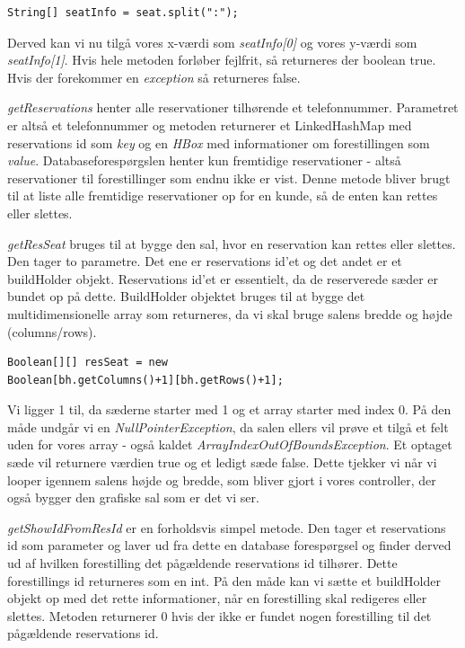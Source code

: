 \documentclass[final]{report}
\begin{document}
\begin{verbatim}
String[] seatInfo = seat.split(":");
\end{verbatim}

Derved kan vi nu tilgå vores x-værdi som \emph{seatInfo[0]} og vores y-værdi som \emph{seatInfo[1]}. Hvis hele metoden forløber fejlfrit, så returneres der boolean true. Hvis der forekommer en \emph{exception} så returneres false. 

\emph{getReservations} henter alle reservationer tilhørende et telefonnummer. Parametret er altså et telefonnummer og metoden returnerer et LinkedHashMap med reservations id som \emph{key} og en \emph{HBox} med informationer om forestillingen som \emph{value}. Databaseforespørgslen henter kun fremtidige reservationer - altså reservationer til forestillinger som endnu ikke er vist. Denne metode bliver brugt til at liste alle fremtidige reservationer op for en kunde, så de enten kan rettes eller slettes. 

\emph{getResSeat} bruges til at bygge den sal, hvor en reservation kan rettes eller slettes. Den tager to parametre. Det ene er reservations id’et og det andet er et buildHolder objekt. Reservations id’et er essentielt, da de reserverede sæder er bundet op på dette. BuildHolder objektet bruges til at bygge det multidimensionelle array som returneres, da vi skal bruge salens bredde og højde (columns/rows).

\begin{verbatim}
Boolean[][] resSeat = new
Boolean[bh.getColumns()+1][bh.getRows()+1];
\end{verbatim}

Vi ligger 1 til, da sæderne starter med 1 og et array starter med index 0. På den måde undgår vi en \emph{NullPointerException}, da salen ellers vil prøve et tilgå et felt uden for vores array - også kaldet \emph{ArrayIndexOutOfBoundsException}. 
Et optaget sæde vil returnere værdien true og et ledigt sæde false. Dette tjekker vi når vi looper igennem salens højde og bredde, som bliver gjort i vores controller, der også bygger den grafiske sal som er det vi ser. 

\emph{getShowIdFromResId} er en forholdsvis simpel metode. Den tager et reservations id som parameter og laver ud fra dette en database forespørgsel og finder derved ud af hvilken forestilling det pågældende reservations id tilhører. Dette forestillings id returneres som en int. På den måde kan vi sætte et buildHolder objekt op med det rette informationer, når en forestilling skal redigeres eller slettes. Metoden returnerer 0 hvis der ikke er fundet nogen forestilling til det pågældende reservations id. 
\end{document}
